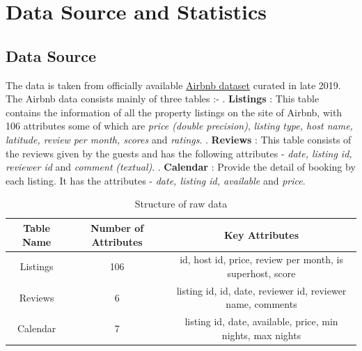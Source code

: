 \documentclass[10pt]{article}
\begin{document}
\section{Data Source and Statistics}

\subsection{Data Source}
The data is taken from officially available \href{http://insideairbnb.com/get-the-data.html}{Airbnb dataset} curated in late 2019. The Airbnb data consists mainly of three tables :-
. \textbf{Listings} : This table contains the information of all the property listings on the site of Airbnb, with 106 attributes some of which are \textit{price (double precision)}, \textit{listing type, host name, latitude, review per month, scores } and \textit{ratings}. 
. \textbf{Reviews} : This table consists of the reviews given by the guests and has the following attributes - \textit{date, listing id, reviewer id} and\textit{ comment} \textit{(textual)}.
. \textbf{Calendar} : Provide the detail of booking by each listing. It has the attributes - \textit{date, listing id, available} and \textit{price}. 
\newline
\begin{table}[!htbp]
\begin{center}
 \begin{tabular}{||c c c ||} 
 \hline
 Table Name & Number of Attributes & Key Attributes \\ [0.5ex] 
 \hline
 Listings &  106 & id, host id, price, review per month, is superhost, score \\ 
 \hline
 Reviews & 6 & listing id, id, date, reviewer id, reviewer name, comments \\
 \hline
 Calendar & 7 & listing id, date, available, price, min nights, max nights\\
 \hline
\end{tabular}
\caption {Structure of raw data}
\end{center}
\end{table}
\end{document}
